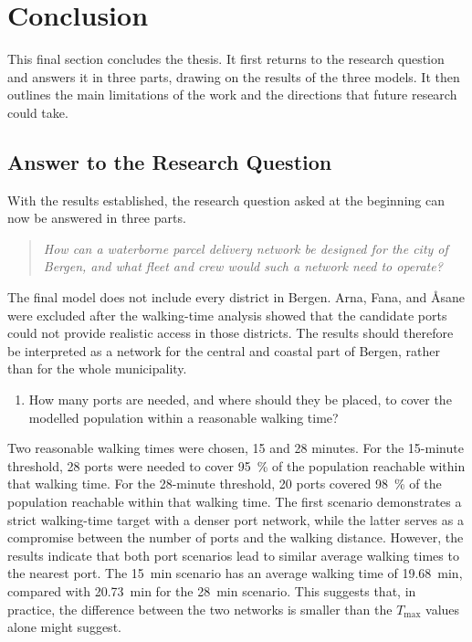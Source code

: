 \documentclass[12pt]{article}
\begin{document}
\section{Conclusion}
\label{sec:conclusion}

This final section concludes the thesis. It first returns to the research question and answers it in three parts, drawing on the results of the three models. It then outlines the main limitations of the work and the directions that future research could take.

\subsection{Answer to the Research Question}
\label{subsec:summary-of-findings}

With the results established, the research question asked at the beginning can now be answered in three parts.

\begin{quote}
  \textit{How can a waterborne parcel delivery network be designed for the city of Bergen, and what fleet and crew would such a network need to operate?}
\end{quote}

The final model does not include every district in Bergen. Arna, Fana, and Åsane were excluded after the walking-time analysis showed that the candidate ports could not provide realistic access in those districts. The results should therefore be interpreted as a network for the central and coastal part of Bergen, rather than for the whole municipality.

\begin{enumerate}
  \item How many ports are needed, and where should they be placed, to cover the modelled population within a reasonable walking time?
\end{enumerate}

Two reasonable walking times were chosen, 15 and 28 minutes. For the 15-minute threshold, 28 ports were needed to cover \qty{95}{\percent} of the population reachable within that walking time. For the 28-minute threshold, 20 ports covered \qty{98}{\percent} of the population reachable within that walking time. The first scenario demonstrates a strict walking-time target with a denser port network, while the latter serves as a compromise between the number of ports and the walking distance. However, the results indicate that both port scenarios lead to similar average walking times to the nearest port. The \qty{15}{\minute} scenario has an average walking time of \qty{19.68}{\minute}, compared with \qty{20.73}{\minute} for the \qty{28}{\minute} scenario. This suggests that, in practice, the difference between the two networks is smaller than the \(T_{\max}\) values alone might suggest.
\end{document}
